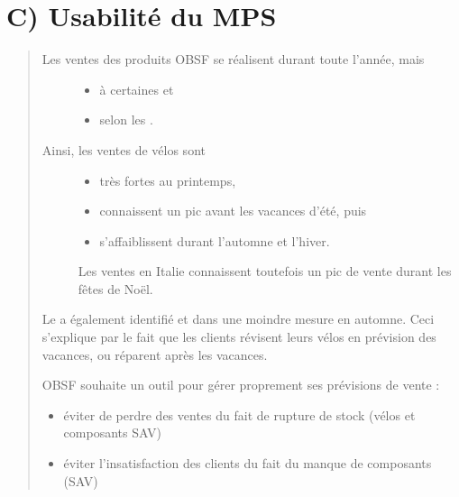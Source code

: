 \documentclass[letterpaper,10pt,french]{sphinxmanual}
\begin{document}
\section{C) Usabilité du MPS}
\label{\detokenize{readthedocs/study:c-usabilite-du-mps}}\begin{quote}
\begin{description}
\item[{Les ventes des produits OBSF se réalisent durant toute l’année, mais }] \leavevmode\begin{itemize}
\item {} 
à certaines  et

\item {} 
selon les .

\end{itemize}

\item[{Ainsi, les ventes de vélos sont}] \leavevmode\begin{itemize}
\item {} 
très fortes au printemps,

\item {} 
connaissent un pic avant les vacances d’été, puis

\item {} 
s’affaiblissent durant l’automne et l’hiver.

\end{itemize}

Les ventes en Italie connaissent toutefois un pic de vente durant les fêtes de Noël.

\end{description}

Le  a également identifié  et dans une moindre mesure en automne. Ceci s’explique par le fait que les clients révisent leurs vélos en prévision des vacances, ou réparent après les vacances.

OBSF souhaite un outil pour gérer proprement ses prévisions de vente :
\begin{itemize}
\item {} 
éviter de perdre des ventes du fait de rupture de stock (vélos et composants SAV)

\item {} 
éviter l’insatisfaction des clients du fait du manque de composants (SAV)


\end{itemize}
\end{quote}
\end{document}
